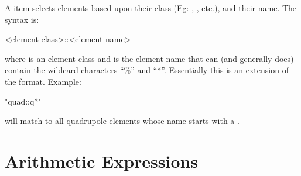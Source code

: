 A  item
selects elements based upon their class (Eg: ,
, etc.), and their name. The syntax is:
\begin{example}
  <element class>::<element name>
\end{example}
where  is an element class and  is the element name that can (and generally does) contain the wildcard characters
``\%'' and ``*''. Essentially this is an extension of the 
format. Example:
\begin{example}
  "quad::q*"
\end{example}
will match to all quadrupole elements whose name starts with a
.

\section{Arithmetic Expressions}
\label{s:arithmetic}

